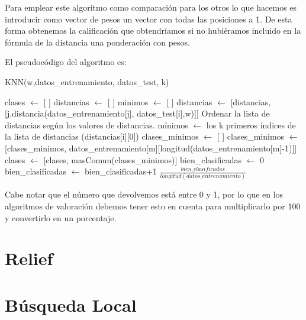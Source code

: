\documentclass[12pt,a4paper]{article}
\begin{document}
	Para emplear este algoritmo como comparación para los otros lo que hacemos es introducir como vector de pesos un vector con todas las posiciones a 1. De esta forma obtenemos la calificación que obtendríamos si no hubiéramos incluido en la fórmula de la distancia una ponderación con pesos.
	
	El pseudocódigo del algoritmo es:
	\begin{algorithm}
		\caption{KNN(w,datos\_entrenamiento, datos\_test, k)}
		\begin{algorithmic}
			\STATE clases $\leftarrow$ [ ]
				\STATE distancias $\leftarrow$ [ ]
				\STATE minimos $\leftarrow$ [ ]
						\STATE distancias $\leftarrow$ [distancias,[j,distancia(datos\_entrenamiento[j], datos\_test[i],w)]]
					\ENDIF
					\STATE Ordenar la lista de distancias según los valores de distancias.
					\STATE mínimos $\leftarrow$ los k primeros índices de la lista de distancias (distancias[i][0])
					\STATE clases\_minimos $\leftarrow$ [ ]
						\STATE clases\_minimos $\leftarrow$ [clases\_minimos, datos\_entrenamiento[m][longitud(datos\_entrenamiento[m]-1)]]
					\STATE clases $\leftarrow$ [clases, masComun(clases\_minimos)]
					\ENDFOR
				\ENDFOR
			\ENDFOR
			\STATE bien\_clasificadas $\leftarrow$ 0
					\STATE bien\_clasificadas $\leftarrow$ bien\_clasificadas+1
				\ENDIF
			\ENDFOR
			\RETURN $\frac{bien\_clasificadas}{longitud(datos\_entrenamiento)}$
		\end{algorithmic}
	\end{algorithm}
	
	Cabe notar que el número que devolvemos está entre 0 y 1, por lo que en los algoritmos de valoración debemos tener esto en cuenta para multiplicarlo por 100 y convertirlo en un porcentaje.

	\section{Relief}
	\label{sec:relief}

	

	\section{Búsqueda Local}
	\label{sec:bl}
\end{document}
